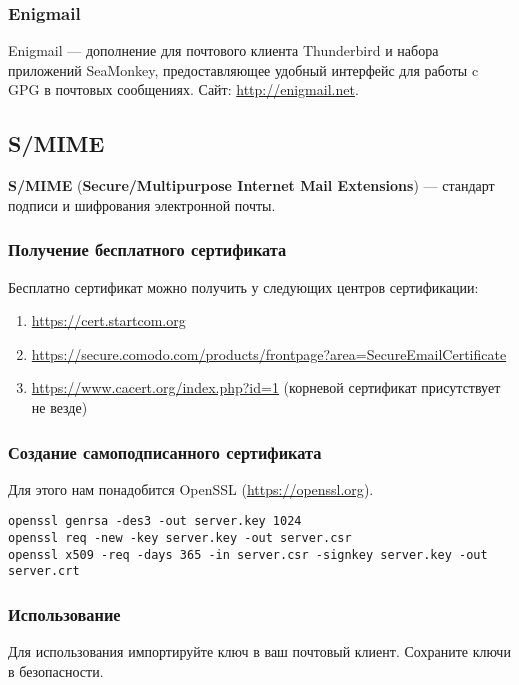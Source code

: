 \subsubsection{Enigmail}
Enigmail --- дополнение для почтового клиента Thunderbird и набора приложений SeaMonkey, предоставляющее удобный интерфейс для работы c GPG в почтовых сообщениях. Сайт: \url{http://enigmail.net}.
\subsection{S/MIME}
\textbf{S/MIME} (\textbf{Secure/Multipurpose Internet Mail Extensions}) --- стандарт подписи и шифрования электронной почты.
\subsubsection{Получение бесплатного сертификата}
Бесплатно сертификат можно получить у следующих центров сертификации:
\begin{enumerate}
\item \url{https://cert.startcom.org}
\item \url{https://secure.comodo.com/products/frontpage?area=SecureEmailCertificate}
\item \url{https://www.cacert.org/index.php?id=1} (корневой сертификат присутствует не везде)
\end{enumerate}
\subsubsection{Создание самоподписанного сертификата}
Для этого нам понадобится OpenSSL (\url{https://openssl.org}).
\begin{lstlisting}
openssl genrsa -des3 -out server.key 1024
openssl req -new -key server.key -out server.csr
openssl x509 -req -days 365 -in server.csr -signkey server.key -out server.crt
\end{lstlisting}
\subsubsection{Использование}
Для использования импортируйте ключ в ваш почтовый клиент. Сохраните ключи в безопасности.


